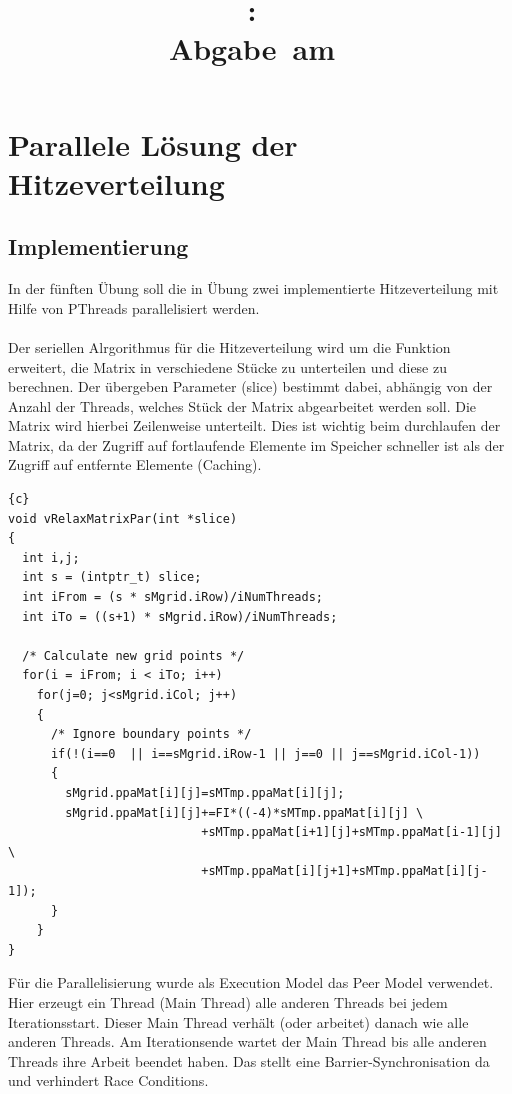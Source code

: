 \documentclass{article}
\title{
\vspace{2in}
\textmd{\textbf{\hmwkClass:\ \hmwkTitle}}\\
\normalsize\vspace{0.1in}\small{Abgabe\ am\ \hmwkDueDate}\\
\vspace{0.1in}\large{\textit{\hmwkClassTime}}
\vspace{3in}
}
\author{\textbf{\hmwkAuthorName}}
\date{} %
\newcommand{\enterProblemHeader}[1]{
}
\newcommand{\exitProblemHeader}[1]{
}
\newcounter{homeworkProblemCounter} %
\newcommand{\homeworkProblemName}{}
\newenvironment{homeworkProblem}[1][Problem \arabic{homeworkProblemCounter}]{ %
\stepcounter{homeworkProblemCounter} %
\renewcommand{\homeworkProblemName}{#1} %
\section{\homeworkProblemName} %
}{
}
\begin{document}
\maketitle
\newpage
\tableofcontents
\newpage
\begin{homeworkProblem}[Parallele Lösung der Hitzeverteilung]
\subsection{Implementierung}
In der fünften Übung soll die in Übung zwei implementierte Hitzeverteilung
mit Hilfe von PThreads parallelisiert werden.
\\\\
Der seriellen Alrgorithmus für die Hitzeverteilung wird um die Funktion 
erweitert, die Matrix in verschiedene Stücke zu unterteilen und diese zu berechnen. 
Der übergeben Parameter (slice) bestimmt dabei, abhängig von der Anzahl der Threads, 
welches Stück der Matrix abgearbeitet werden soll. Die Matrix wird hierbei Zeilenweise
unterteilt. Dies ist wichtig beim durchlaufen der Matrix, da der Zugriff auf
fortlaufende Elemente im Speicher schneller ist als der Zugriff auf entfernte Elemente
(Caching).
\begin{lstlisting}{c}
void vRelaxMatrixPar(int *slice)
{
  int i,j;
  int s = (intptr_t) slice;
  int iFrom = (s * sMgrid.iRow)/iNumThreads;
  int iTo = ((s+1) * sMgrid.iRow)/iNumThreads;

  /* Calculate new grid points */
  for(i = iFrom; i < iTo; i++)
    for(j=0; j<sMgrid.iCol; j++)
    {
      /* Ignore boundary points */
      if(!(i==0  || i==sMgrid.iRow-1 || j==0 || j==sMgrid.iCol-1))
      {
        sMgrid.ppaMat[i][j]=sMTmp.ppaMat[i][j];
        sMgrid.ppaMat[i][j]+=FI*((-4)*sMTmp.ppaMat[i][j] \
                           +sMTmp.ppaMat[i+1][j]+sMTmp.ppaMat[i-1][j] \
                           +sMTmp.ppaMat[i][j+1]+sMTmp.ppaMat[i][j-1]);
      }
    }
}
\end{lstlisting}
Für die Parallelisierung wurde als Execution Model das Peer Model verwendet. Hier 
erzeugt ein Thread (Main Thread) alle anderen Threads bei jedem Iterationsstart. Dieser 
Main Thread verhält (oder arbeitet) danach wie alle anderen Threads. Am Iterationsende
wartet der Main Thread bis alle anderen Threads ihre Arbeit beendet haben. Das stellt
eine Barrier-Synchronisation da und verhindert Race Conditions.


\end{homeworkProblem}
\end{document}
